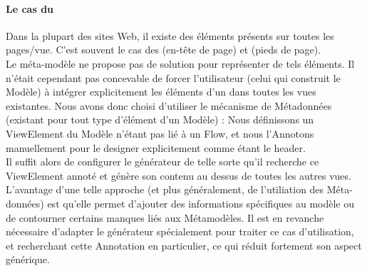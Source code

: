 \paragraph{Le cas du }\label{par:cinematic_header}
Dans la plupart des sites Web, il existe des éléments présents sur toutes les pages/vue. C'est souvent le cas des  (en-tête de page) et  (pieds de page).\\
Le méta-modèle \kwcinematic ne propose pas de solution pour représenter de tels éléments. Il n'était cependant pas concevable de forcer l'utilisateur (celui qui construit le Modèle) à intégrer explicitement les éléments d'un  dans toutes les vues existantes.
Nous avons donc choisi d'utiliser le mécanisme de Métadonnées (existant pour tout type d'élément d'un Modèle) : Nous définissons un ViewElement du Modèle n'étant pas lié à un Flow, et nous l'Annotons manuellement pour le designer explicitement comme étant le header.\\
Il suffit alors de configurer le générateur de telle sorte qu'il recherche ce ViewElement annoté et génère son contenu au dessus de toutes les autres vues. L'avantage d'une telle approche (et plus généralement, de l'utiliation des Méta-données) est qu'elle permet d'ajouter des informations spécifiques au modèle ou de contourner certains manques liés aux Métamodèles. Il est en revanche nécessaire d'adapter le générateur spécialement pour traiter ce cas d'utilisation, et recherchant cette Annotation en particulier, ce qui réduit fortement son aspect générique.

